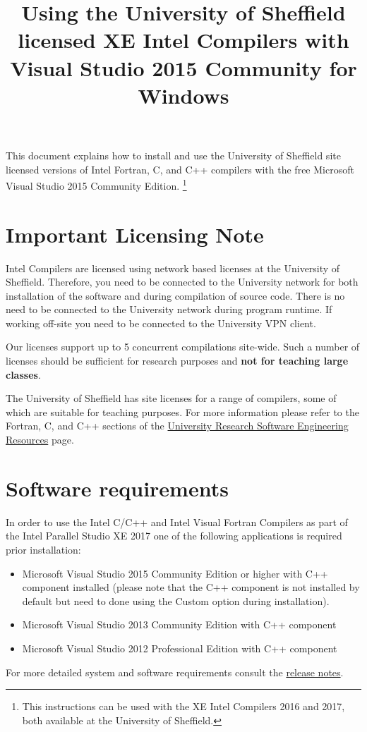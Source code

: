 \documentclass[10pt,a4paper,oneside]{article}
\title{Using the University of Sheffield licensed XE Intel Compilers with Visual Studio 2015 Community for Windows}
\date{}
\begin{document}
\maketitle
This document explains how to install and use the University of Sheffield site licensed versions of Intel Fortran, C, and C++ compilers with the free Microsoft Visual Studio 2015 Community Edition. \footnote{This instructions can be used with the XE Intel Compilers 2016 and 2017, both available at the University of Sheffield.}

\section*{Important Licensing Note}
Intel Compilers are licensed using network based licenses at the University of Sheffield. Therefore, you need to be connected to the University network for both installation of the software and during compilation of source code. There is no need to be connected to the University network during program runtime. If working off-site you need to be connected to the University VPN client.

Our licenses support up to 5 concurrent compilations site-wide. Such a number of licenses should be sufficient for research purposes and \textbf{not for teaching large classes}. 

The University of Sheffield has site licenses for a range of compilers, some of which are suitable for teaching purposes. For more information please refer to the Fortran, C, and C++ sections of the \href{http://rse.shef.ac.uk/resources/}{University Research Software Engineering Resources} page. 

\section*{Software requirements}
In order to use the Intel C/C++ and Intel Visual Fortran Compilers as part of the Intel Parallel Studio XE 2017  one of the following applications is required prior installation:
\begin{itemize}
\item Microsoft Visual Studio 2015 Community Edition or higher with C++ component installed (please note that the C++ component is not installed by default but need to done using the Custom option during installation).
\item Microsoft Visual Studio 2013 Community Edition with C++ component
\item Microsoft Visual Studio 2012 Professional Edition with C++ component
\end{itemize}
For  more detailed system and software requirements consult the \href{https://software.intel.com/en-us/articles/intel-parallel-studio-xe-release-notes}{release notes}.
\newpage
\end{document}
